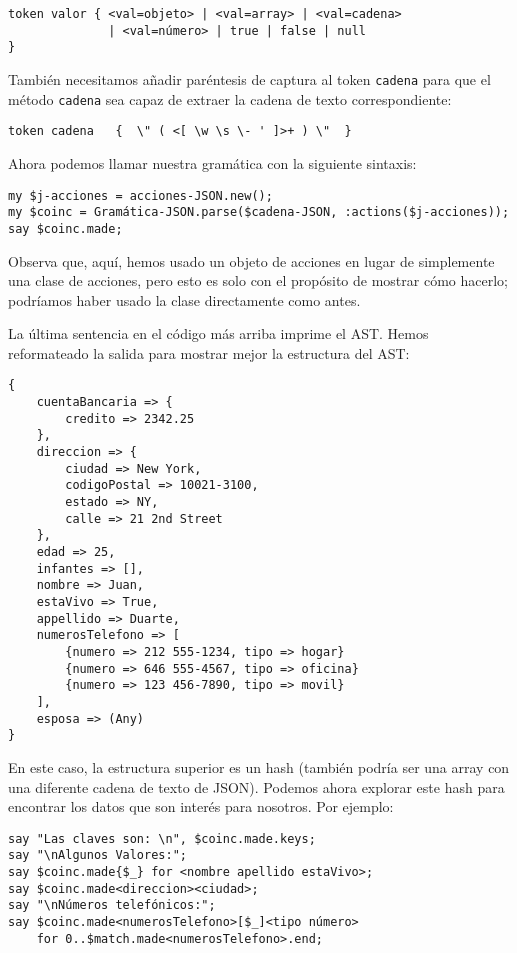 \begin{lstlisting}
token valor { <val=objeto> | <val=array> | <val=cadena> 
              | <val=número> | true | false | null
}
\end{lstlisting}

También necesitamos añadir paréntesis de captura al token {\tt cadena}
para que el método {\tt cadena} sea capaz de extraer la cadena de texto
correspondiente:

\begin{lstlisting}
token cadena   {  \" ( <[ \w \s \- ' ]>+ ) \"  }
\end{lstlisting}

Ahora podemos llamar nuestra gramática con la siguiente sintaxis:

\begin{lstlisting}
my $j-acciones = acciones-JSON.new();
my $coinc = Gramática-JSON.parse($cadena-JSON, :actions($j-acciones));
say $coinc.made;
\end{lstlisting}

Observa que, aquí, hemos usado un objeto de acciones en lugar
de simplemente una clase de acciones, pero esto es solo con 
el propósito de mostrar cómo hacerlo; podríamos haber usado
la clase directamente como antes.

La última sentencia en el código más arriba imprime el AST.
Hemos reformateado la salida para mostrar mejor la estructura
del AST:


\begin{lstlisting}
{
    cuentaBancaria => {
        credito => 2342.25
    }, 
    direccion => {
        ciudad => New York, 
        codigoPostal => 10021-3100, 
        estado => NY, 
        calle => 21 2nd Street
    }, 
    edad => 25, 
    infantes => [], 
    nombre => Juan, 
    estaVivo => True, 
    appellido => Duarte, 
    numerosTelefono => [
        {numero => 212 555-1234, tipo => hogar} 
        {numero => 646 555-4567, tipo => oficina} 
        {numero => 123 456-7890, tipo => movil}
    ], 
    esposa => (Any)
}
\end{lstlisting}

En este caso, la estructura superior es un hash (también podría ser una array
con una diferente cadena de texto de JSON). Podemos ahora explorar
este hash para encontrar los datos que son interés para nosotros.
Por ejemplo:

\begin{lstlisting}
say "Las claves son: \n", $coinc.made.keys;
say "\nAlgunos Valores:";
say $coinc.made{$_} for <nombre apellido estaVivo>;
say $coinc.made<direccion><ciudad>;
say "\nNúmeros telefónicos:";
say $coinc.made<numerosTelefono>[$_]<tipo número> 
    for 0..$match.made<numerosTelefono>.end;
\end{lstlisting}

